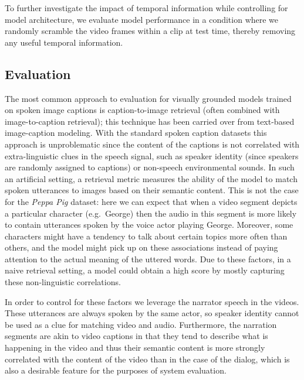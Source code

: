 To further investigate the impact of temporal information while 
controlling for model architecture, we evaluate model performance in a 
condition where we randomly scramble the video frames within a clip at test 
time, thereby removing any useful temporal information.


\subsection{Evaluation}
\label{sec:eval}
The most common approach to evaluation for visually grounded models
trained on spoken image captions is caption-to-image retrieval (often
combined with image-to-caption retrieval); this technique
has been carried over from text-based image-caption modeling.
 With the standard spoken caption datasets this approach is unproblematic since
the content of the captions is not correlated with extra-linguistic
clues in the speech signal, such as speaker identity (since speakers
are randomly assigned to captions) or non-speech environmental
sounds. In such an artificial setting, a retrieval metric measures the ability of the
model to match spoken utterances to images based on their semantic
content. This is not the case for the {\it Peppa Pig} dataset: here we
can expect that when a video segment depicts a particular character
(e.g.\ George) then the audio in this segment is more likely to contain
utterances spoken by the voice actor playing George.  Moreover, some 
characters might have a tendency to talk about certain topics more often 
than others, and the model might pick up on these associations instead of 
paying attention to the actual meaning of the uttered words.
%
Due to these factors, in a naive retrieval setting, a model
could obtain a high score by mostly capturing these non-linguistic
correlations.

In order to control for these factors we leverage the
narrator speech in the videos. These utterances are always spoken by
the same actor, so speaker identity cannot be used as a clue for
matching video and audio. Furthermore, the narration segments are akin
to video captions in that they tend to describe what is happening in
the video and thus their semantic content is more strongly
correlated with the content of the video than in the case of the
dialog, which is also a desirable feature for the purposes of system
evaluation.

